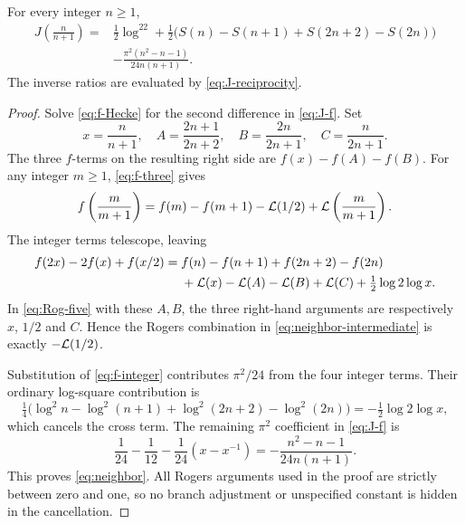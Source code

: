 \begin{theorem}\label{thm:neighbor}
For every integer $n\ge1$,
\begin{equation}\label{eq:neighbor}
 \boxed{\begin{aligned}
 J\left(\frac n{n+1}\right)={}&\frac12\log^22
 +\frac12\bigl(S(n)-S(n+1)+S(2n+2)-S(2n)\bigr)\\
 &-\frac{\pi^2(n^2-n-1)}{24n(n+1)}.
 \end{aligned}}
\end{equation}
The inverse ratios are evaluated by \eqref{eq:J-reciprocity}.
\end{theorem}
\begin{proof}
Solve \eqref{eq:f-Hecke} for the second difference in
\eqref{eq:J-f}. Set
\[
 x=\frac n{n+1},\quad A=\frac{2n+1}{2n+2},\quad
 B=\frac{2n}{2n+1},\quad C=\frac n{2n+1}.
\]
The three $f$-terms on the resulting right side are $f(x)-f(A)-f(B)$.
For any integer $m\ge1$, \eqref{eq:f-three} gives
\[
 f\left(\frac m{m+1}\right)=f(m)-f(m+1)-\mathcal L(1/2)
                                      +\mathcal L\left(\frac m{m+1}\right).
\]
The integer terms telescope, leaving
\begin{equation}\label{eq:neighbor-intermediate}
 \begin{split}
 f(2x)-2f(x)+f(x/2)={}&f(n)-f(n+1)+f(2n+2)-f(2n)\\
 &+\mathcal L(x)-\mathcal L(A)-\mathcal L(B)+\mathcal L(C)
   +\tfrac12\log2\log x.
 \end{split}
\end{equation}
In \eqref{eq:Rog-five} with these $A,B$, the three right-hand arguments
are respectively $x$, $1/2$ and $C$. Hence the Rogers combination in
\eqref{eq:neighbor-intermediate} is exactly $-\mathcal L(1/2)$.

Substitution of \eqref{eq:f-integer} contributes $\pi^2/24$ from the
four integer terms. Their ordinary log-square contribution is
\[
 \tfrac14\bigl(\log^2n-\log^2(n+1)+\log^2(2n+2)-\log^2(2n)\bigr)
 =-\tfrac12\log2\log x,
\]
which cancels the cross term. The remaining $\pi^2$ coefficient in
\eqref{eq:J-f} is
\[
 \frac1{24}-\frac1{12}-\frac1{24}(x-x^{-1})
 =-\frac{n^2-n-1}{24n(n+1)}.
\]
This proves \eqref{eq:neighbor}. All Rogers arguments used in the proof
are strictly between zero and one, so no branch adjustment or unspecified
constant is hidden in the cancellation.
\end{proof}

